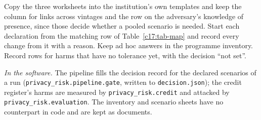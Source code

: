 \begin{inpractice}
\setlength{\emergencystretch}{3em}%
Copy the three worksheets into the institution's own templates and keep the column
for links across vintages and the row on the adversary's knowledge of presence, since
those decide whether a pooled scenario is needed. Start each declaration from the
matching row of Table~\ref{c17:tab-map} and record every change from it with a
reason. Keep ad hoc answers in the programme inventory. Record rows for harms that
have no tolerance yet, with the decision ``not set''.

\smallskip\noindent\textit{In the software.} The pipeline fills the decision record
for the declared scenarios of a run (\texttt{privacy\_\allowbreak{}risk.\allowbreak{}pipeline.\allowbreak{}gate}, written to
\texttt{decision.\allowbreak{}json}); the credit register's harms are measured by
\texttt{privacy\_\allowbreak{}risk.\allowbreak{}credit} and attacked by \texttt{privacy\_\allowbreak{}risk.\allowbreak{}evaluation}. The
inventory and scenario sheets have no counterpart in code and are kept as documents.
\end{inpractice}
